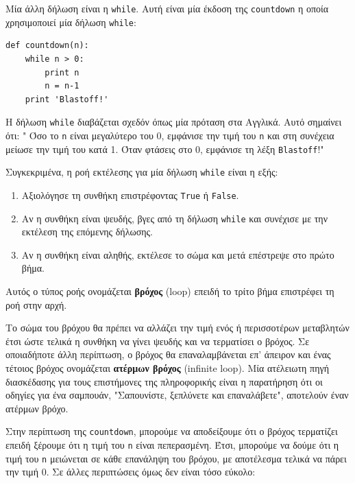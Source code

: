 \documentclass[10pt]{book}
\begin{document}
Μία άλλη δήλωση είναι η {\tt while}. Αυτή είναι μία έκδοση
της {\tt countdown} η οποία χρησιμοποιεί μία δήλωση {\tt while}:

\begin{verbatim}
def countdown(n):
    while n > 0:
        print n
        n = n-1
    print 'Blastoff!'
\end{verbatim}
%

Η δήλωση {\tt while} διαβάζεται σχεδόν όπως μία πρόταση στα Αγγλικά.
Αυτό σημαίνει ότι: " Όσο το {\tt n} είναι μεγαλύτερο του 0,
εμφάνισε την τιμή του {\tt n} και στη συνέχεια μείωσε την τιμή του κατά 1.
Όταν φτάσεις στο 0, εμφάνισε τη λέξη {\tt Blastoff}!"

Συγκεκριμένα, η ροή εκτέλεσης για μία δήλωση {\tt while} είναι η εξής:

\begin{enumerate}

\item Αξιολόγησε τη συνθήκη επιστρέφοντας {\tt True} ή {\tt False}.

\item Αν η συνθήκη είναι ψευδής, βγες από τη δήλωση  {\tt while}  και συνέχισε με την εκτέλεση της επόμενης δήλωσης.

\item Αν η συνθήκη είναι αληθής, εκτέλεσε το σώμα και μετά επέστρεψε στο πρώτο βήμα.

\end{enumerate}

Αυτός ο τύπος ροής ονομάζεται {\bf βρόχος} (loop) επειδή το
τρίτο βήμα επιστρέφει τη ροή στην αρχή.

Το σώμα του βρόχου θα πρέπει να αλλάζει την τιμή ενός ή περισσοτέρων
μεταβλητών έτσι ώστε τελικά η συνθήκη να γίνει ψευδής και να τερματίσει
ο βρόχος. Σε οποιαδήποτε άλλη περίπτωση, ο βρόχος θα επαναλαμβάνεται επ' άπειρον και ένας τέτοιος βρόχος ονομάζεται {\bf ατέρμων βρόχος} (infinite loop). Μία ατέλειωτη πηγή διασκέδασης για τους επιστήμονες της
πληροφορικής είναι η παρατήρηση ότι οι οδηγίες για ένα σαμπουάν, 
"Σαπουνίστε, ξεπλύνετε και επαναλάβετε", αποτελούν έναν ατέρμων βρόχο.

Στην περίπτωση της {\tt countdown}, μπορούμε να αποδείξουμε ότι ο
βρόχος τερματίζει επειδή ξέρουμε ότι η τιμή του {\tt n} είναι πεπερασμένη.
Έτσι, μπορούμε να δούμε ότι η τιμή του {\tt n} μειώνεται σε κάθε επανάληψη του βρόχου, με αποτέλεσμα τελικά να πάρει την τιμή 0. Σε άλλες περιπτώσεις όμως δεν είναι τόσο εύκολο:
\end{document}
